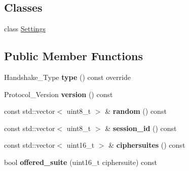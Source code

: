 \subsection*{Classes}
\begin{DoxyCompactItemize}
\item 
class \hyperlink{class_botan_1_1_t_l_s_1_1_client___hello_1_1_settings}{Settings}
\end{DoxyCompactItemize}
\subsection*{Public Member Functions}
\begin{DoxyCompactItemize}
\item 
\mbox{\label{class_botan_1_1_t_l_s_1_1_client___hello_ad4a149baa547ebdda7eb7bd0337df1bb}} 
Handshake\+\_\+\+Type {\bfseries type} () const override
\item 
\mbox{\label{class_botan_1_1_t_l_s_1_1_client___hello_a39cc16019ece063688370495d3172260}} 
Protocol\+\_\+\+Version {\bfseries version} () const
\item 
\mbox{\label{class_botan_1_1_t_l_s_1_1_client___hello_aefd20decceddadc72574ea99ac02c45e}} 
const std\+::vector$<$ uint8\+\_\+t $>$ \& {\bfseries random} () const
\item 
\mbox{\label{class_botan_1_1_t_l_s_1_1_client___hello_ae6653c8214bb701b0074abd864f4f2bd}} 
const std\+::vector$<$ uint8\+\_\+t $>$ \& {\bfseries session\+\_\+id} () const
\item 
\mbox{\label{class_botan_1_1_t_l_s_1_1_client___hello_ab6417bb1546d803e0fcb89252ca1f5c5}} 
const std\+::vector$<$ uint16\+\_\+t $>$ \& {\bfseries ciphersuites} () const
\item 
\mbox{\label{class_botan_1_1_t_l_s_1_1_client___hello_a24f31b634e35a2e554ef28ce6ea39ee1}} 
bool {\bfseries offered\+\_\+suite} (uint16\+\_\+t ciphersuite) const
\item 
\mbox{\label{class_botan_1_1_t_l_s_1_1_client___hello_ad19741dbebef039775fdfe53db08dace}} 

\end{DoxyCompactItemize}
